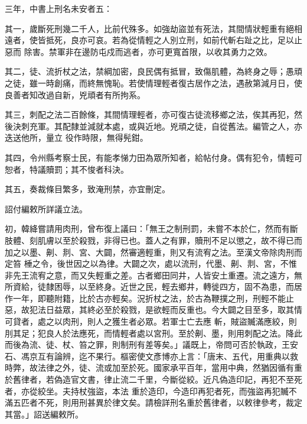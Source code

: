 \begin{pinyinscope}
 三年，中書上刑名未安者五：



 其一，歲斷死刑幾二千人，比前代殊多。如強劫盜並有死法，其間情狀輕重有絕相遠者，使皆抵死，良亦可哀。若為從情輕之人別立刑，如前代斬右趾之比，足以止惡而
 除害。禁軍非在邊防屯戍而逃者，亦可更寬首限，以收其勇力之效。



 其二，徒、流折杖之法，禁綱加密，良民偶有抵冒，致傷肌體，為終身之辱；愚頑之徒，雖一時創痛，而終無愧恥。若使情理輕者復古居作之法，遇赦第減月日，使良善者知改過自新，兇頑者有所拘系。



 其三，刺配之法二百餘條，其間情理輕者，亦可復古徒流移鄉之法，俟其再犯，然後決刺充軍。其配隸並減就本處，或與近地。兇頑之徒，自從舊法。編管之人，亦迭送他所，量立
 役作時限，無得髡鉗。



 其四，令州縣考察士民，有能孝悌力田為眾所知者，給帖付身。偶有犯令，情輕可恕者，特議贖罰；其不悛者科決。



 其五，奏裁條目繁多，致淹刑禁，亦宜刪定。



 詔付編敕所詳議立法。



 初，韓絳嘗請用肉刑，曾布復上議曰：「無王之制刑罰，未嘗不本於仁，然而有斷肢體、刻肌膚以至於殺戮，非得已也。蓋人之有罪，贖刑不足以懲之，故不得已而加之以墨、劓、剕、宮、大闢，然審適輕重，則又有流宥之法。至漢文帝除肉刑而定笞
 棰之令，後世因之以為律。大闢之次，處以流刑，代墨、劓、剕、宮，不惟非先王流宥之意，而又失輕重之差。古者鄉田同井，人皆安土重遷。流之遠方，無所資給，徒隸困辱，以至終身。近世之民，輕去鄉井，轉徙四方，固不為患，而居作一年，即聽附籍，比於古亦輕矣。況折杖之法，於古為鞭撲之刑，刑輕不能止惡，故犯法日益眾，其終必至於殺戮，是欲輕而反重也。今大闢之目至多，取其情可貸者，處之以肉刑，則人之獲生者必眾。若軍士亡去應
 斬，賊盜贓滿應絞，則刖其足；犯良人於法應死，而情輕者處以宮刑。至於劓、墨，則用刺配之法。降此而後為流、徒、杖、笞之罪，則制刑有差等矣。」議既上，帝問可否於執政，王安石、馮京互有論辨，迄不果行。樞密使文彥博亦上言：「唐末、五代，用重典以救時弊，故法律之外，徒、流或加至於死。國家承平百年，當用中典，然猶因循有重於舊律者，若偽造官文書，律止流二千里，今斷從絞。近凡偽造印記，再犯不至死者，亦從絞坐。夫持杖強盜，本法
 重於造印，今造印再犯者死，而強盜再犯贓不滿五匹者不死，則用刑甚異於律文矣。請檢詳刑名重於舊律者，以敕律參考，裁定其當。」詔送編敕所。




\end{pinyinscope}
